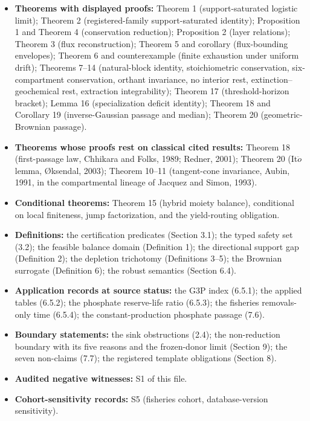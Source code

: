\documentclass[11pt]{article}
\begin{document}
\begin{itemize}\setlength{\itemsep}{2pt}
\item \textbf{Theorems with displayed proofs:} Theorem 1 (support-saturated logistic limit); Theorem 2 (registered-family support-saturated identity); Proposition 1 and Theorem 4 (conservation reduction); Proposition 2 (layer relations); Theorem 3 (flux reconstruction); Theorem 5 and corollary (flux-bounding envelopes); Theorem 6 and counterexample (finite exhaustion under uniform drift); Theorems 7--14 (natural-block identity, stoichiometric conservation, six-compartment conservation, orthant invariance, no interior rest, extinction--geochemical rest, extraction integrability); Theorem 17 (threshold-horizon bracket); Lemma 16 (specialization deficit identity); Theorem 18 and Corollary 19 (inverse-Gaussian passage and median); Theorem 20 (geometric-Brownian passage).
\item \textbf{Theorems whose proofs rest on classical cited results:} Theorem 18 (first-passage law, Chhikara and Folks, 1989; Redner, 2001); Theorem 20 (It\(\ddot{o}\) lemma, \(\text{\O}\)ksendal, 2003); Theorem 10--11 (tangent-cone invariance, Aubin, 1991, in the compartmental lineage of Jacquez and Simon, 1993).
\item \textbf{Conditional theorems:} Theorem 15 (hybrid moiety balance), conditional on local finiteness, jump factorization, and the yield-routing obligation.
\item \textbf{Definitions:} the certification predicates (Section 3.1); the typed safety set (3.2); the feasible balance domain (Definition 1); the directional support gap (Definition 2); the depletion trichotomy (Definitions 3--5); the Brownian surrogate (Definition 6); the robust semantics (Section 6.4).
\item \textbf{Application records at source status:} the G3P index (6.5.1); the applied tables (6.5.2); the phosphate reserve-life ratio (6.5.3); the fisheries removals-only time (6.5.4); the constant-production phosphate passage (7.6).
\item \textbf{Boundary statements:} the sink obstructions (2.4); the non-reduction boundary with its five reasons and the frozen-donor limit (Section 9); the seven non-claims (7.7); the registered template obligations (Section 8).
\item \textbf{Audited negative witnesses:} S1 of this file.
\item \textbf{Cohort-sensitivity records:} S5 (fisheries cohort, database-version sensitivity).
\end{itemize}
\end{document}

